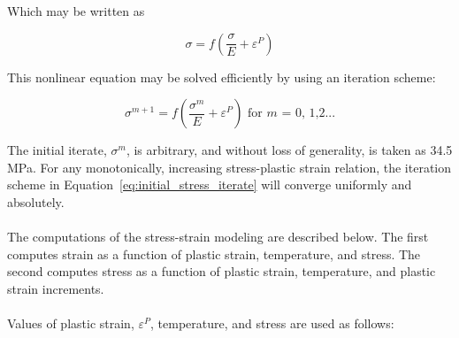 Which may be written as

\begin{equation}
    \label{eq:sigma_rewritten}
    \sigma=f \left( \frac{\sigma}{E}+\varepsilon^P \right)
\end{equation}

This nonlinear equation may be solved efficiently by using an iteration
scheme:

\begin{equation} 
    \label{eq:initial_stress_iterate}
    \sigma^{m+1}=f \left( \frac{\sigma^m}{E}+\varepsilon^P \right) \text{ for $m$ = 0, 1,2...}
\end{equation} 

The initial iterate, $\sigma^{m}$, is arbitrary, and without loss of generality, is taken as 34.5
MPa. For any monotonically, increasing stress-plastic strain relation, the iteration scheme in
Equation~\ref{eq:initial_stress_iterate} will converge uniformly and absolutely.
\\
\\
The computations of the stress-strain modeling are described below. The first computes strain as a
function of plastic strain, temperature, and stress. The second computes stress as a function of
plastic strain, temperature, and plastic strain increments.
\\
\\
Values of plastic strain, $\varepsilon^{P}$, temperature, and stress are used as follows:

